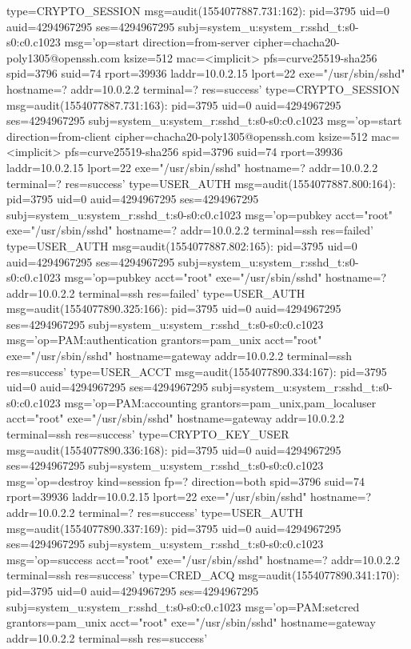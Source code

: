\documentclass[]{report}
\newenvironment{Shaded}{}{}
\newcommand{\NormalTok}[1]{#1}
\begin{document}
\begin{Shaded}
\begin{Highlighting}[]
\NormalTok{type=CRYPTO_SESSION msg=audit(1554077887.731:162): pid=3795 uid=0 auid=4294967295 ses=4294967295 subj=system_u:system_r:sshd_t:s0-s0:c0.c1023 msg='op=start direction=from-server cipher=chacha20-poly1305@openssh.com ksize=512 mac=<implicit> pfs=curve25519-sha256 spid=3796 suid=74 rport=39936 laddr=10.0.2.15 lport=22  exe="/usr/sbin/sshd" hostname=? addr=10.0.2.2 terminal=? res=success'}
\NormalTok{type=CRYPTO_SESSION msg=audit(1554077887.731:163): pid=3795 uid=0 auid=4294967295 ses=4294967295 subj=system_u:system_r:sshd_t:s0-s0:c0.c1023 msg='op=start direction=from-client cipher=chacha20-poly1305@openssh.com ksize=512 mac=<implicit> pfs=curve25519-sha256 spid=3796 suid=74 rport=39936 laddr=10.0.2.15 lport=22  exe="/usr/sbin/sshd" hostname=? addr=10.0.2.2 terminal=? res=success'}
\NormalTok{type=USER_AUTH msg=audit(1554077887.800:164): pid=3795 uid=0 auid=4294967295 ses=4294967295 subj=system_u:system_r:sshd_t:s0-s0:c0.c1023 msg='op=pubkey acct="root" exe="/usr/sbin/sshd" hostname=? addr=10.0.2.2 terminal=ssh res=failed'}
\NormalTok{type=USER_AUTH msg=audit(1554077887.802:165): pid=3795 uid=0 auid=4294967295 ses=4294967295 subj=system_u:system_r:sshd_t:s0-s0:c0.c1023 msg='op=pubkey acct="root" exe="/usr/sbin/sshd" hostname=? addr=10.0.2.2 terminal=ssh res=failed'}
\NormalTok{type=USER_AUTH msg=audit(1554077890.325:166): pid=3795 uid=0 auid=4294967295 ses=4294967295 subj=system_u:system_r:sshd_t:s0-s0:c0.c1023 msg='op=PAM:authentication grantors=pam_unix acct="root" exe="/usr/sbin/sshd" hostname=gateway addr=10.0.2.2 terminal=ssh res=success'}
\NormalTok{type=USER_ACCT msg=audit(1554077890.334:167): pid=3795 uid=0 auid=4294967295 ses=4294967295 subj=system_u:system_r:sshd_t:s0-s0:c0.c1023 msg='op=PAM:accounting grantors=pam_unix,pam_localuser acct="root" exe="/usr/sbin/sshd" hostname=gateway addr=10.0.2.2 terminal=ssh res=success'}
\NormalTok{type=CRYPTO_KEY_USER msg=audit(1554077890.336:168): pid=3795 uid=0 auid=4294967295 ses=4294967295 subj=system_u:system_r:sshd_t:s0-s0:c0.c1023 msg='op=destroy kind=session fp=? direction=both spid=3796 suid=74 rport=39936 laddr=10.0.2.15 lport=22  exe="/usr/sbin/sshd" hostname=? addr=10.0.2.2 terminal=? res=success'}
\NormalTok{type=USER_AUTH msg=audit(1554077890.337:169): pid=3795 uid=0 auid=4294967295 ses=4294967295 subj=system_u:system_r:sshd_t:s0-s0:c0.c1023 msg='op=success acct="root" exe="/usr/sbin/sshd" hostname=? addr=10.0.2.2 terminal=ssh res=success'}
\NormalTok{type=CRED_ACQ msg=audit(1554077890.341:170): pid=3795 uid=0 auid=4294967295 ses=4294967295 subj=system_u:system_r:sshd_t:s0-s0:c0.c1023 msg='op=PAM:setcred grantors=pam_unix acct="root" exe="/usr/sbin/sshd" hostname=gateway addr=10.0.2.2 terminal=ssh res=success'}

\end{Highlighting}
\end{Shaded}
\end{document}
